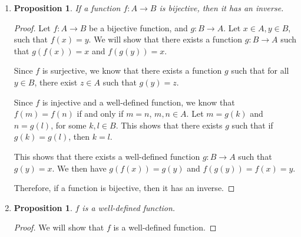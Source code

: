 \documentclass{article}
\newtheorem{prop}[thm]{Proposition}
\begin{document}
\begin{enumerate}
\begin{proof}
    If $f$ is not injective, then there exists $m, n \in A$ such that $m \neq n$ and $f(m) = f(n)$. We then have $g(f(m)) = g(f(n))$. However, since $g(f(m)) = m$ and $g(f(n)) = n$, we have $m = n$, which contradicts our assumption. Thus, $f$ is injective.

    If $f$ is not subjective, then there exists $k \in B$ such that for all $l \in A$, $f(l) \neq k$. We then have $f(g(k)) \neq k$. However, this contradicts our assumption that $f(g(y)) = y$ , for all $y \in B$. Therefore, $f$ is surjective.

    Combining these two cases, our assumption that $f$ is not bijective is contradicted. 

    Therefore, if there exists an inverse of $f$, then $f$ is bijective.
\end{proof}

\item 
\begin{prop}
     If a function $f: A \rightarrow B$ is bijective, then it has an inverse.
\end{prop}
\begin{proof}
    Let $f: A \rightarrow B$ be a bijective function, and $g: B \rightarrow A$. Let $x \in A, y \in B$, such that $f(x) = y$. We will show that there exists a function $g: B \rightarrow A$ such that $g(f(x)) = x$ and $f(g(y)) = x$. 
    
    Since $f$ is surjective, we know that there exists a function $g$ such that for all $y \in B$, there exist $z \in A$ such that $g(y) = z$. 
    
    Since $f$ is injective and a well-defined function, we know that $f(m) = f(n)$ if and only if $m = n$, $m,n \in A$. Let $m = g(k)$ and $n = g(l)$, for some $k, l \in B$. This shows that there exists $g$ such that if $g(k) = g(l)$, then $k = l$. 
    
    This shows that there exists a well-defined function $g: B \rightarrow A$ such that $g(y) = x$. We then have $g(f(x)) = g(y)$ and $f(g(y)) = f(x) = y$.

    Therefore, if a function is bijective, then it has an inverse.
\end{proof}

\item 
\begin{prop}
   $f$ is a well-defined function.
\end{prop}
\begin{proof}
    We will show that $f$ is a well-defined function.


\end{proof}
\end{enumerate}
\end{document}

